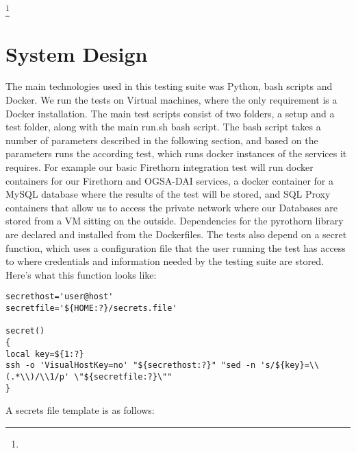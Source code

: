 \documentclass[review,5p,authoryear,12pt]{elsarticle}
\begin{document}
\footnote{}

\section{System Design}
\label{sec:System Design}

The main technologies used in this testing suite was Python, bash scripts and Docker. We run the tests on Virtual machines, where the only requirement is a Docker installation. 
The main test scripts consist of two folders, a setup and a test folder, along
with the main run.sh bash script. The bash script takes a number of parameters
described in the following section, and based on the parameters runs the according test, which runs docker instances of the services it requires. For example our basic Firethorn integration test will run docker containers for our Firethorn and OGSA-DAI services, a docker container for a MySQL database where the results of the test will be stored, and SQL Proxy containers that allow us to access the private network where our Databases are stored from a VM sitting on the outside.
Dependencies for the pyrothorn library are declared and installed from the Dockerfiles. 
The tests also depend on a secret function, which uses a configuration file that the user running the test has access to where credentials and information needed by the testing suite are stored.
Here's what this function looks like:

\begin{verbatim}
secrethost='user@host'
secretfile='${HOME:?}/secrets.file'

secret()
{
local key=${1:?}
ssh -o 'VisualHostKey=no' "${secrethost:?}" "sed -n 's/${key}=\\(.*\\)/\\1/p' \"${secretfile:?}\"" 
}
\end{verbatim}


A secrets file template is as follows:
\end{document}
